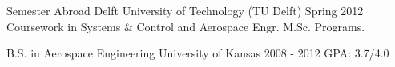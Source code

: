 \begin{cventries}
  \cventry
    {Semester Abroad} %
    {Delft University of Technology (TU Delft)} %
    {} %
    {Spring 2012} %
    {Coursework in Systems \& Control and Aerospace Engr. M.Sc. Programs.}
    
  \cventry
    {B.S. in Aerospace Engineering} %
    {University of Kansas} %
    {} %
    {2008 - 2012} %
    {GPA: 3.7/4.0}
\end{cventries}
